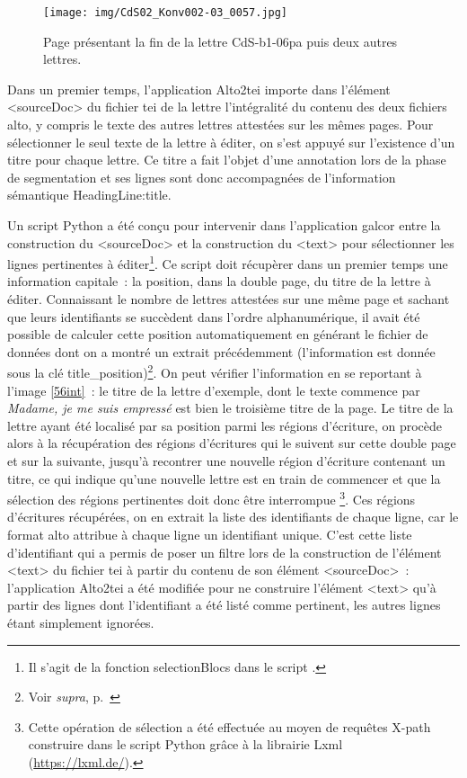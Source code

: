 \documentclass[a4paper,12pt,twoside]{book}
\begin{document}
			\begin{figure}[!h]
				\centering
				\texttt{[image: img/CdS02\_Konv002-03\_0057.jpg]}
				\caption{Page présentant la fin de la lettre \textsf{CdS-b1-06pa} puis deux autres lettres.}
				\label{57int}
			\end{figure}
		
			Dans un premier temps, l'application Alto2tei importe dans l'élément \textsf{<sourceDoc>} du fichier \gls{tei} de la lettre l'intégralité du contenu des deux fichiers \gls{alto}, y compris le texte des autres lettres attestées sur les mêmes pages. Pour sélectionner le seul texte de la lettre à éditer, on s'est appuyé sur l'existence d'un titre pour chaque lettre. Ce titre a fait l'objet d'une annotation lors de la phase de \gls{segmentation} et ses lignes sont donc accompagnées de l'information sémantique \textsf{HeadingLine:title}.
			
			Un script Python a été conçu pour intervenir dans l'application \gls{galcor} entre la construction du \textsf{<sourceDoc>} et la construction du \textsf{<text>} pour sélectionner les lignes pertinentes à éditer\footnote{Il s'agit de la fonction \textsf{selectionBlocs} dans le script \cite{biayCdsFonctionsPy2022}.}. Ce script doit récupèrer dans un premier temps une information capitale~: la position, dans la double page, du titre de la lettre à éditer. Connaissant le nombre de lettres attestées sur une même page et sachant que leurs identifiants se succèdent dans l'ordre alphanumérique, il avait été possible de calculer cette position automatiquement en générant le fichier de données dont on a montré un extrait précédemment (l'information est donnée sous la clé \textsf{title\_position})\footnote{Voir \textit{supra}, p.~\pageref{json-CdS-b1-06pa}}. On peut vérifier l'information en se reportant à l'image \ref{56int}~: le titre de la lettre d'exemple, dont le texte commence par \textit{Madame, je me suis empressé} est bien le troisième titre de la page. Le titre de la lettre ayant été localisé par sa position parmi les régions d'écriture, on procède alors à la récupération des régions d'écritures qui le suivent sur cette double page et sur la suivante, jusqu'à recontrer une nouvelle région d'écriture contenant un titre, ce qui indique qu'une nouvelle lettre est en train de commencer et que la sélection des régions pertinentes doit donc être interrompue
			\footnote{Cette opération de sélection a été effectuée au moyen de requêtes X-path construire dans le script Python grâce à la librairie Lxml (\url{https://lxml.de/}).}. Ces régions d'écritures récupérées, on en extrait la liste des identifiants de chaque ligne, car le format \gls{alto} attribue à chaque ligne un identifiant unique. C'est cette liste d'identifiant qui a permis de poser un filtre lors de la construction de l'élément \textsf{<text>} du fichier \gls{tei} à partir du contenu de son élément \textsf{<sourceDoc>}~: l'application Alto2tei a été modifiée pour ne construire l'élément \textsf{<text>} qu'à partir des lignes dont l'identifiant a été listé comme pertinent, les autres lignes étant simplement ignorées.
			
\end{document}

